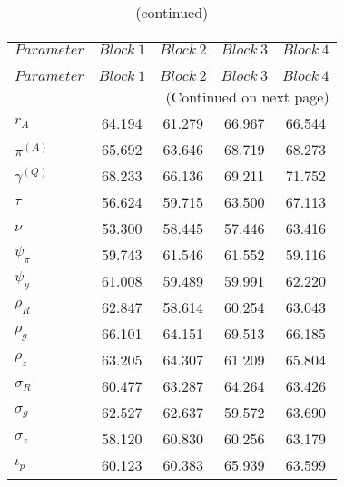  
\begin{center}
\begin{longtable}{lcccc} 
\caption{MCMC Inefficiency factors per block}\\
 \label{Table:MCMC_inefficiency_factors}\\
\toprule 
$Parameter         $	 & 	 $     Block~1$	 & 	 $     Block~2$	 & 	 $     Block~3$	 & 	 $     Block~4$\\
\midrule \endfirsthead 
\caption{(continued)}\\
 \toprule \\ 
$Parameter         $	 & 	 $     Block~1$	 & 	 $     Block~2$	 & 	 $     Block~3$	 & 	 $     Block~4$\\
\midrule \endhead 
\midrule \multicolumn{5}{r}{(Continued on next page)} \\ \bottomrule \endfoot 
\bottomrule \endlastfoot 
$ {r_{A}}          $	 & 	      64.194	 & 	      61.279	 & 	      66.967	 & 	      66.544 \\ 
$ {\pi^{(A)}}      $	 & 	      65.692	 & 	      63.646	 & 	      68.719	 & 	      68.273 \\ 
$ {\gamma^{(Q)}}   $	 & 	      68.233	 & 	      66.136	 & 	      69.211	 & 	      71.752 \\ 
$ {\tau}           $	 & 	      56.624	 & 	      59.715	 & 	      63.500	 & 	      67.113 \\ 
$ {\nu}            $	 & 	      53.300	 & 	      58.445	 & 	      57.446	 & 	      63.416 \\ 
$ {\psi_\pi}       $	 & 	      59.743	 & 	      61.546	 & 	      61.552	 & 	      59.116 \\ 
$ {\psi_y}         $	 & 	      61.008	 & 	      59.489	 & 	      59.991	 & 	      62.220 \\ 
$ {\rho_R}         $	 & 	      62.847	 & 	      58.614	 & 	      60.254	 & 	      63.043 \\ 
$ {\rho_{g}}       $	 & 	      66.101	 & 	      64.151	 & 	      69.513	 & 	      66.185 \\ 
$ {\rho_z}         $	 & 	      63.205	 & 	      64.307	 & 	      61.209	 & 	      65.804 \\ 
$ {\sigma_R}       $	 & 	      60.477	 & 	      63.287	 & 	      64.264	 & 	      63.426 \\ 
$ {\sigma_{g}}     $	 & 	      62.527	 & 	      62.637	 & 	      59.572	 & 	      63.690 \\ 
$ {\sigma_z}       $	 & 	      58.120	 & 	      60.830	 & 	      60.256	 & 	      63.179 \\ 
$ {\iota_p}        $	 & 	      60.123	 & 	      60.383	 & 	      65.939	 & 	      63.599 \\ 
\end{longtable}
 \end{center}
